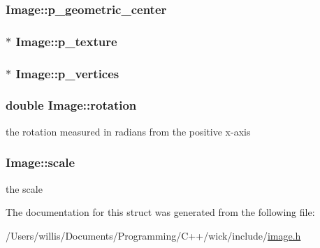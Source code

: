 \hypertarget{struct_image_aba183bc46eecd0f94b610522badb6503}{
\subsubsection[{p\-\_\-geometric\-\_\-center}]{ Image\-::p\-\_\-geometric\-\_\-center}}\label{struct_image_aba183bc46eecd0f94b610522badb6503}
\hypertarget{struct_image_a6ee2052d785bd48fad50f16e1501c9e6}{
\subsubsection[{p\-\_\-texture}]{$\ast$ Image\-::p\-\_\-texture}}\label{struct_image_a6ee2052d785bd48fad50f16e1501c9e6}
\hypertarget{struct_image_af5c8a308476f59471d0587235811c054}{
\subsubsection[{p\-\_\-vertices}]{$\ast$ Image\-::p\-\_\-vertices}}\label{struct_image_af5c8a308476f59471d0587235811c054}
\hypertarget{struct_image_a5343f2a6b580fa15a341909a6d73583e}{
\subsubsection[{rotation}]{\setlength{\rightskip}{0pt plus 5cm}double Image\-::rotation}}\label{struct_image_a5343f2a6b580fa15a341909a6d73583e}
the rotation measured in radians from the positive x-\/axis \hypertarget{struct_image_a9dc95c6e2e8ed8db87a6422bdea7f282}{
\subsubsection[{scale}]{ Image\-::scale}}\label{struct_image_a9dc95c6e2e8ed8db87a6422bdea7f282}
the scale 

The documentation for this struct was generated from the following file\-:\begin{DoxyCompactItemize}
\item 
/\-Users/willis/\-Documents/\-Programming/\-C++/wick/include/\hyperlink{image_8h}{image.\-h}\end{DoxyCompactItemize}
